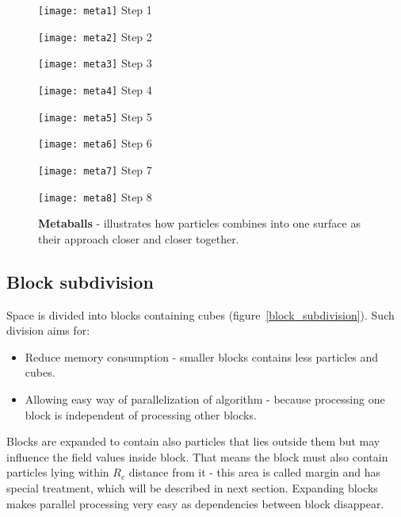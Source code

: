 \begin{figure}[ht]
\begin{minipage}[b]{0.24\linewidth}
\centering
\texttt{[image: meta1]}
Step 1
\end{minipage}
\begin{minipage}[b]{0.24\linewidth}
\centering
\texttt{[image: meta2]}
Step 2
\end{minipage}
\begin{minipage}[b]{0.24\linewidth}
\centering
\texttt{[image: meta3]}
Step 3
\end{minipage}
\begin{minipage}[b]{0.24\linewidth}
\centering
\texttt{[image: meta4]}
Step 4
\end{minipage}
\begin{minipage}[b]{0.24\linewidth}
\centering
\texttt{[image: meta5]}
Step 5
\end{minipage}
\begin{minipage}[b]{0.24\linewidth}
\centering
\texttt{[image: meta6]}
Step 6
\end{minipage}
\begin{minipage}[b]{0.24\linewidth}
\centering
\texttt{[image: meta7]}
Step 7
\end{minipage}
\begin{minipage}[b]{0.24\linewidth}
\centering
\texttt{[image: meta8]}
Step 8
\end{minipage}
\caption{\textbf{Metaballs} - illustrates how particles combines into one surface as their approach closer and closer together. }
\label{metaballs}
\end{figure}

\subsection{Block subdivision} \label{sec:block_subdivision}
Space is divided into blocks containing cubes (figure~\ref{block_subdivision}). Such division aims for:
\begin{itemize}
\item Reduce memory consumption - smaller blocks contains less particles and cubes. 
\item Allowing easy way of parallelization of algorithm - because processing one block is independent of processing other blocks. 
\end{itemize}
Blocks are expanded to contain also particles that lies outside them but may influence the field values inside block. That means the block must also contain particles lying within $R_c$ distance from it - this area is called margin and has special treatment, which will be described in next section. Expanding blocks makes parallel processing very easy as dependencies between block disappear.

